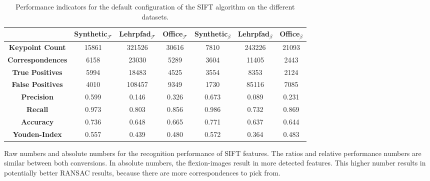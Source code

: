 \begin{table}
    {\renewcommand{\arraystretch}{1.3}%
    \setlength{\tabcolsep}{0.3em}%
    \begin{tabular}{ccccccc}
    \toprule
    \null &
        \textbf{Synthetic$_{\mathbf{\mathcal{F}}}$} &
        \textbf{Lehrpfad$_{\mathbf{\mathcal{F}}}$} &
        \textbf{Office$_{\mathbf{\mathcal{F}}}$} &
        \textbf{Synthetic$_{\mathbf{\mathcal{\beta}}}$} &
        \textbf{Lehrpfad$_{\mathbf{\mathcal{\beta}}}$} &
        \textbf{Office$_{\mathbf{\mathcal{\beta}}}$} \\
    \midrule
    \rowcolor{lightgray}
    \textbf{Keypoint Count} &
        \num{15861} & \num{321526} & \num{30616} &
        \num{7810} & \num{243226} & \num{21093} \\
    \textbf{Correspondences} &
        \num{6158} & \num{23030} & \num{5289} &
        \num{3604} & \num{11405} & \num{2443} \\
    \rowcolor{lightgray}
    \textbf{True Positives} &
        \num{5994} & \num{18483} & \num{4525} &
        \num{3554} & \num{8353} & \num{2124} \\
    \textbf{False Positives} &
        \num{4010} & \num{108457} & \num{9349} &
        \num{1730} & \num{85116} & \num{7085} \\
    \rowcolor{lightgray}
    \textbf{Precision} &
        \num{0.599} & \num{0.146} & \num{0.326} &
        \num{0.673} & \num{0.089} & \num{0.231} \\
    \textbf{Recall} &
        \num{0.973} & \num{0.803} & \num{0.856} &
        \num{0.986} & \num{0.732} & \num{0.869} \\
    \rowcolor{lightgray}
    \textbf{Accuracy} &
        \num{0.736} & \num{0.648} & \num{0.665} &
        \num{0.771} & \num{0.637} & \num{0.644} \\
    \textbf{Youden-Index} &
        \num{0.557} & \num{0.439} & \num{0.480} &
        \num{0.572} & \num{0.364} & \num{0.483} \\
    \bottomrule
    \end{tabular}
    }
    \caption{Performance indicators for the default configuration of the SIFT algorithm on the different datasets.}
\end{table}
Raw numbers and absolute numbers for the recognition performance of SIFT features.
The ratios and relative performance numbers are similar between both conversions.
In absolute numbers, the \glspl{flexion-image} result in more detected features.
This higher number results in potentially better RANSAC results, because there are more correspondences to pick from.
